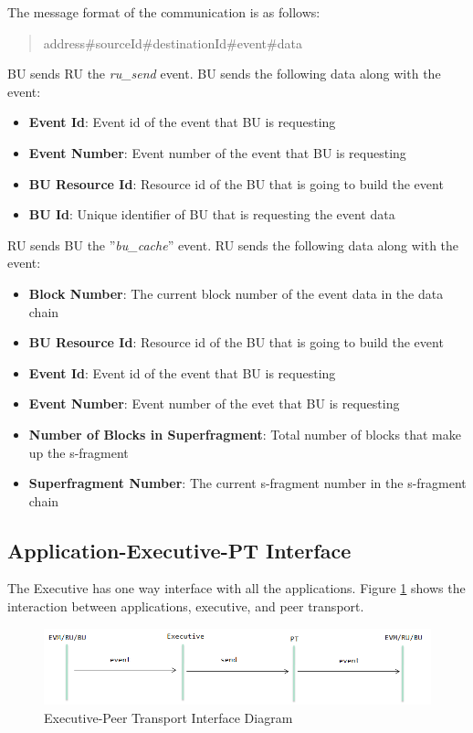 The message format of the communication is as follows:

\begin{quote}
	address\#sourceId\#destinationId\#event\#data
\end{quote}

BU sends RU the \textit{ru\_send} event. BU sends the following data along with the event:

\begin{itemize}
	\item \textbf{Event Id}: Event id of the event that BU is requesting
	\item \textbf{Event Number}: Event number of the event that BU is requesting
	\item \textbf{BU Resource Id}: Resource id of the BU that is going to build the event
	\item \textbf{BU Id}: Unique identifier of BU that is requesting the event data
\end{itemize}

RU sends BU the ''\textit{bu\_cache}'' event. RU sends the following data along with the event:

\begin{itemize}
	\item \textbf{Block Number}: The current block number of the event data in the data chain
	\item	\textbf{BU Resource Id}: Resource id of the BU that is going to build the event
	\item \textbf{Event Id}: Event id of the event that BU is requesting
	\item \textbf{Event Number}: Event number of the evet that BU is requesting
	\item \textbf{Number of Blocks in Superfragment}: Total number of blocks that make up the s-fragment
	\item \textbf{Superfragment Number}: The current s-fragment number in the s-fragment chain
\end{itemize}


\subsection{Application-Executive-PT Interface}

The Executive has one way interface with all the applications. Figure \ref{fig:exec-pt} shows the interaction between applications, executive, and peer transport.

\begin{figure}
	\centering
		\includegraphics[width=1.0\textwidth]{figures/exec-pt.png}
	\caption{Executive-Peer Transport Interface Diagram}
	\label{fig:exec-pt}
\end{figure}

